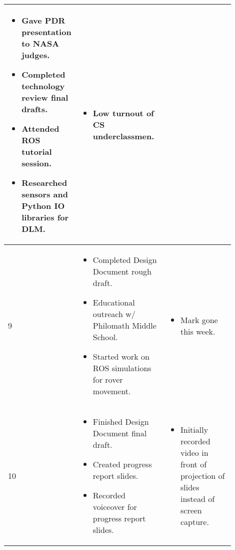 \documentclass[onecolumn, draftclsnofoot,10pt, compsoc]{IEEEtran}
\newenvironment{myitemize}
{ \begin{itemize}
    \setlength{\itemsep}{0pt}
    \setlength{\parskip}{0pt}
    \setlength{\parsep}{0pt}     }
{ \end{itemize}                  }
\begin{document}
\begin{singlespacing}
\begin{tabular} {l p{0.45\linewidth} p{0.45\linewidth}}
\begin{myitemize}
\item Gave PDR presentation to NASA judges.
\item Completed technology review final drafts.
\item Attended ROS tutorial session.
\item Researched sensors and Python IO libraries for DLM.
\vspace{-\baselineskip}\end{myitemize} & 
\vspace{-\baselineskip}\begin{myitemize}
\item Low turnout of CS underclassmen. 
\vspace{-\baselineskip}\end{myitemize} \\\hline
9 &
\vspace{-\baselineskip}\begin{myitemize}
\item Completed Design Document rough draft.
\item Educational outreach w/ Philomath Middle School.
\item Started work on ROS simulations for rover movement.
\vspace{-\baselineskip}\end{myitemize} & 
\vspace{-\baselineskip}\begin{myitemize}
\item Mark gone this week.
\vspace{-\baselineskip}\end{myitemize} \\\hline
10 &
\vspace{-\baselineskip}\begin{myitemize}
\item Finished Design Document final draft.
\item Created progress report slides.
\item Recorded voiceover for progress report slides.
\vspace{-\baselineskip}\end{myitemize} & 
\vspace{-\baselineskip}\begin{myitemize}
\item Initially recorded video in front of projection of slides instead of screen capture.
\vspace{-\baselineskip}\end{myitemize} \\\hline
\end{tabular}
\end{singlespacing}
\end{document}
